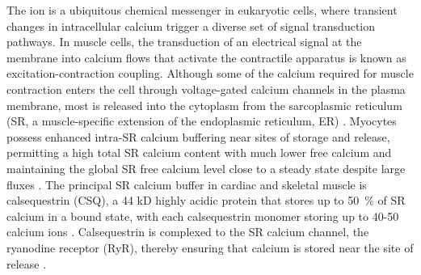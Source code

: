 \noindent The  ion is a ubiquitous chemical messenger in eukaryotic cells, where transient changes in intracellular calcium trigger a diverse set of signal transduction pathways. In muscle cells, the transduction of an electrical signal at the membrane into calcium flows that activate the contractile apparatus is known as excitation-contraction coupling. Although some of the calcium required for muscle contraction enters the cell through voltage-gated calcium channels in the plasma membrane, most is released into the cytoplasm from the sarcoplasmic reticulum (SR, a muscle-specific extension of the endoplasmic reticulum, ER) \supercite{Bers2004-ns}. Myocytes possess enhanced intra-SR calcium buffering near sites of storage and release, permitting a high total SR calcium content with much lower free calcium and maintaining the global SR free calcium level close to a steady state despite large fluxes \supercite{Royer2009-ql,Guerrero-Hernandez2020-sw}. The principal SR calcium buffer in cardiac and skeletal muscle is calsequestrin (CSQ), a 44 kD highly acidic protein that stores up to \SI{50}{\percent} of SR calcium in a bound state, with each calsequestrin monomer storing up to 40-50 calcium ions \supercite{MacLennan1971-fw,MacLennan1974-rv,Ostwald1974-yr,Costello1986-ma,Franzini-Armstrong1987-xb,Wang1998-cm,Park2004-bu,Knollmann2006-vy}. Calsequestrin is complexed to the SR calcium channel, the ryanodine receptor (RyR), thereby ensuring that calcium is stored near the site of release \supercite{Bers2004-ns}. 
